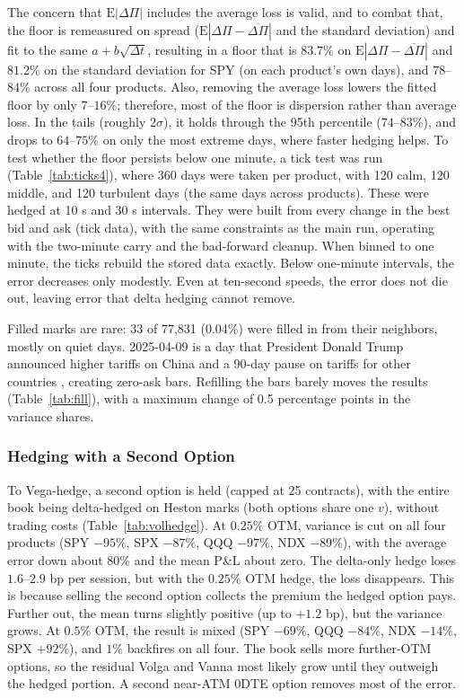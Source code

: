 \documentclass[11pt]{article}
\begin{document}
The concern that $\mathrm{E}|\Delta\Pi|$ includes the average loss is valid, and to combat that, the floor is remeasured on spread ($\mathrm{E}|\Delta\Pi - \overline{\Delta\Pi}|$ and the standard deviation) and fit to the same $a + b\sqrt{\Delta t}$, resulting in a floor that is $83.7\%$ on $\mathrm{E}|\Delta\Pi - \overline{\Delta\Pi}|$ and $81.2\%$ on the standard deviation for SPY (on each product's own days), and $78$--$84\%$ across all four products. Also, removing the average loss lowers the fitted floor by only $7$--$16\%$; therefore, most of the floor is dispersion rather than average loss. In the tails (roughly $2\sigma$), it holds through the 95th percentile ($74$--$83\%$), and drops to $64$--$75\%$ on only the most extreme days, where faster hedging helps.
To test whether the floor persists below one minute, a tick test was run (Table~\ref{tab:ticks4}), where 360 days were taken per product, with 120 calm, 120 middle, and 120 turbulent days (the same days across products). These were hedged at 10 s and 30 s intervals. They were built from every change in the best bid and ask (tick data), with the same constraints as the main run, operating with the two-minute carry and the bad-forward cleanup. When binned to one minute, the ticks rebuild the stored data exactly.
Below one-minute intervals, the error decreases only modestly. Even at ten-second speeds, the error does not die out, leaving error that delta hedging cannot remove.

Filled marks are rare: 33 of 77{,}831 (0.04\%) were filled in from their neighbors, mostly on quiet days. 2025-04-09 is a day that President Donald Trump announced higher tariffs on China and a 90-day pause on tariffs for other countries \cite{trumppost}, creating zero-ask bars. Refilling the bars barely moves the results (Table~\ref{tab:fill}), with a maximum change of 0.5 percentage points in the variance shares.

\subsubsection{Hedging with a Second Option}
\label{sec:volhedge}

To Vega-hedge, a second option is held (capped at 25 contracts), with the entire book being delta-hedged on Heston marks (both options share one $v$), without trading costs (Table~\ref{tab:volhedge}). At $0.25\%$ OTM, variance is cut on all four products (SPY $-95\%$, SPX $-87\%$, QQQ $-97\%$, NDX $-89\%$), with the average error down about $80\%$ and the mean P\&L about zero. The delta-only hedge loses $1.6$--$2.9$ bp per session, but with the $0.25\%$ OTM hedge, the loss disappears. This is because selling the second option collects the premium the hedged option pays. Further out, the mean turns slightly positive (up to $+1.2$ bp), but the variance grows. At $0.5\%$ OTM, the result is mixed (SPY $-69\%$, QQQ $-84\%$, NDX $-14\%$, SPX $+92\%$), and $1\%$ backfires on all four. The book sells more further-OTM options, so the residual Volga and Vanna most likely grow until they outweigh the hedged portion. A second near-ATM 0DTE option removes most of the error.
\end{document}
